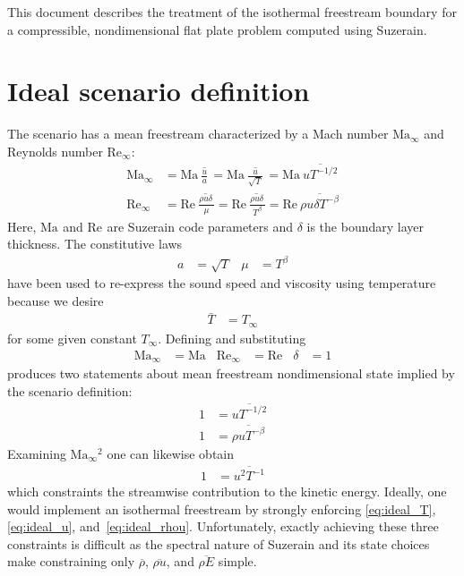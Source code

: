 \documentclass[letterpaper,11pt,nointlimits,reqno]{amsart}
\newcommand{\Mach}[1][]{\mbox{Ma}_{#1}}
\newcommand{\Reynolds}[1][]{\mbox{Re}_{#1}}
\begin{document}
This document describes the treatment of the isothermal freestream boundary for
a compressible, nondimensional flat plate problem computed using Suzerain.

\section{Ideal scenario definition}

The scenario has a mean freestream characterized by a Mach number
$\Mach[\infty]$ and Reynolds number $\Reynolds[\infty]$:
\begin{align}
  \Mach[\infty]{}
  &= \Mach{} \overline{\,\frac{u}{a}\,}
   = \Mach{} \overline{\,\frac{u}{\sqrt{T}}\,}
   = \Mach\, \overline{u T^{-1/2}}
\\
  \Reynolds[\infty]{}
  &= \Reynolds{} \overline{\,\frac{\rho u \delta\,} {\mu}}
   = \Reynolds{} \overline{\,\frac{\rho u \delta\,} {T^\beta}}
   = \Reynolds\, \overline{\rho u \delta T^{-\beta}}
\end{align}
Here, $\Mach$ and $\Reynolds$ are Suzerain code parameters and $\delta$ is the
boundary layer thickness.  The constitutive laws
\begin{align}
  a &= \sqrt{T}
&\mu &= {T}^\beta
\end{align}
have been used to re-express the sound speed and viscosity using temperature
because we desire
\begin{align}
  \label{eq:ideal_T}
  \bar{T} &= T_\infty
\end{align}
for some given constant $T_\infty$.  Defining and substituting
\begin{align}
  \Mach[\infty]{} &= \Mach
& \Reynolds[\infty]{} &= \Reynolds
& \delta &= 1
\end{align}
produces two statements about mean freestream nondimensional state implied by
the scenario definition:
\begin{align}
  \label{eq:ideal_u}
  1 &= \overline{u T^{-1/2}}
\\
  \label{eq:ideal_rhou}
  1 &= \overline{\rho u T^{-\beta}}
\end{align}
Examining $\Mach[\infty]{}^2$ one can likewise obtain
\begin{align}
  \label{eq:ideal_u2}
  1 &= \overline{u^2 T^{-1}}
\end{align}
which constraints the streamwise contribution to the kinetic energy.  Ideally,
one would implement an isothermal freestream by strongly enforcing
\eqref{eq:ideal_T}, \eqref{eq:ideal_u}, and~\eqref{eq:ideal_rhou}.
Unfortunately, exactly achieving these three constraints is difficult as the
spectral nature of Suzerain and its state choices make constraining only
$\overline{\rho}$, $\overline{\rho{}u}$, and $\overline{\rho{}E}$ simple.
\end{document}
